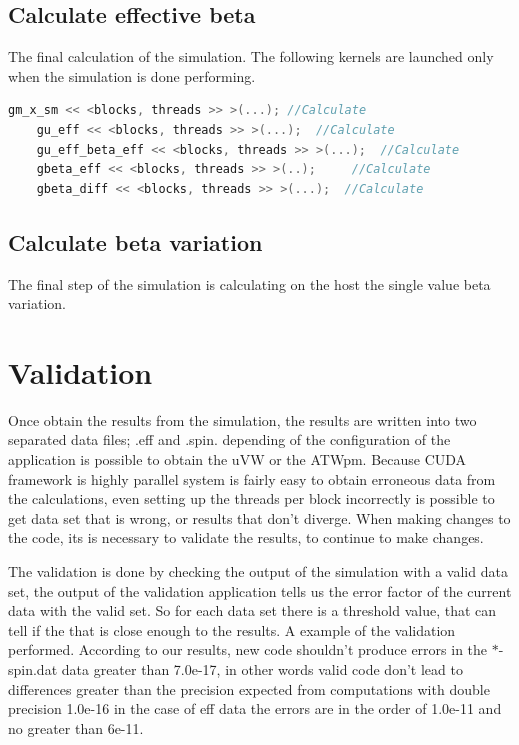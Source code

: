 \subsection{Calculate effective beta}

The final calculation of the simulation. The following kernels are launched only when the simulation is done performing.


\begin{lstlisting}[language=C++, label={lst:rk4}, caption={Runge y Kutta integration}]	
    gm_x_sm << <blocks, threads >> >(...); //Calculate
    gu_eff << <blocks, threads >> >(...);  //Calculate 
    gu_eff_beta_eff << <blocks, threads >> >(...); 	//Calculate
    gbeta_eff << <blocks, threads >> >(..); 	//Calculate
    gbeta_diff << <blocks, threads >> >(...);  //Calculate             
\end{lstlisting}


\subsection{Calculate beta variation}

The final step of the simulation is calculating on the host the single value beta variation.



\section{Validation}

Once obtain the results from the simulation, the results are written into two separated data files; .eff and .spin. depending of the configuration of the application is possible to obtain the uVW or the ATWpm. Because CUDA framework is highly parallel system is fairly easy to obtain erroneous data from the calculations, even setting up the threads per block incorrectly is possible to get data set that is wrong, or results that don't diverge. When making changes to the code, its is necessary to  validate the results, to continue to make changes.

The validation is done by checking the output of the simulation with a valid data set, the output of the validation application tells us the error factor of the current data with the valid set. So for each data set there is a threshold value, that can tell if the that is close enough to the results. A example of the validation performed.
According to our results, new code shouldn't produce errors in the $*$-spin.dat data 
greater than 7.0e-17, in other words valid code don't lead to differences greater than
the precision expected from computations with double precision 1.0e-16 in the case of
eff data the errors are in the order of 1.0e-11 and no greater than 6e-11.

